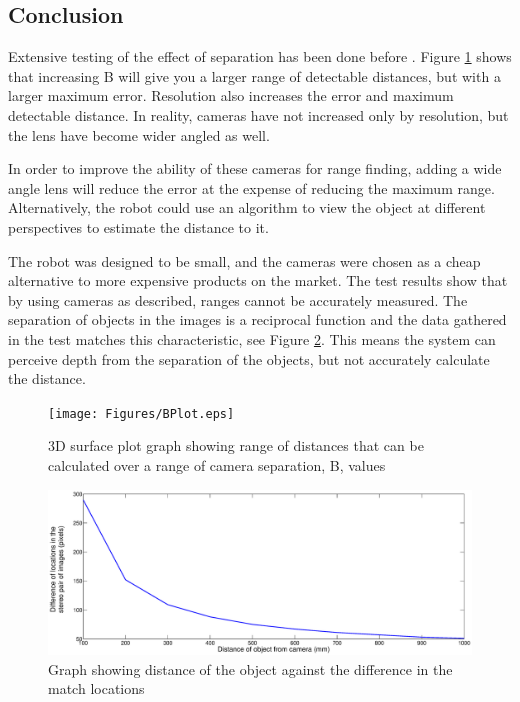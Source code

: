 \subsection{Conclusion}

Extensive testing of the effect of separation has been done before \citep{Mrovlje:Distance_Stereoscopic}. Figure \ref{fig:B:Plot} shows that increasing B will give you a larger range of detectable distances, but with a larger maximum error. Resolution also increases the error and maximum detectable distance. In reality, cameras have not increased only by resolution, but the lens have become wider angled as well. 

In order to improve the ability of these cameras for range finding, adding a wide angle lens will reduce the error at the expense of reducing the maximum range. Alternatively, the robot could use an algorithm to view the object at different perspectives to estimate the distance to it. 

The robot was designed to be small, and the cameras were chosen as a cheap alternative to more expensive products on the market. The test results show that by using cameras as described, ranges cannot be accurately measured. The separation of objects in the images is a reciprocal function and the data gathered in the test matches this characteristic, see Figure \ref{fig:Distance:DeltaX}. This means the system can perceive depth from the separation of the objects, but not accurately calculate the distance. 

\begin{figure}
\texttt{[image: Figures/BPlot.eps]}
\caption{3D surface plot graph showing range of distances that can be calculated over a range of camera separation, B, values}
\label{fig:B:Plot}
\end{figure}
\begin{figure}
\includegraphics[width=\textwidth]{Figures/Distance_DeltaX.eps}
\caption{Graph showing distance of the object against the difference in the match locations}
\label{fig:Distance:DeltaX}
\end{figure}
